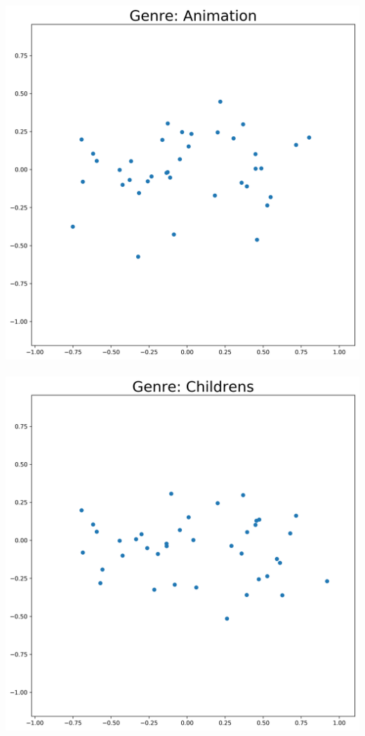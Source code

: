 \includegraphics[scale=0.26]{"genres/Genre: Animation"} \\ \\
\includegraphics[scale=0.26]{"genres/Genre: Childrens"}  
